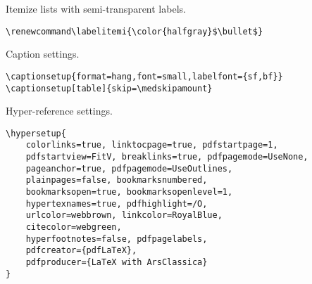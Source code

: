 Itemize lists with semi-transparent labels.
\begin{lstlisting}
\renewcommand\labelitemi{\color{halfgray}$\bullet$} 
\end{lstlisting}



Caption settings.
\begin{lstlisting}
\captionsetup{format=hang,font=small,labelfont={sf,bf}}
\captionsetup[table]{skip=\medskipamount}
\end{lstlisting}



Hyper-reference settings.
\begin{lstlisting}
\hypersetup{
    colorlinks=true, linktocpage=true, pdfstartpage=1, 
    pdfstartview=FitV, breaklinks=true, pdfpagemode=UseNone, 
    pageanchor=true, pdfpagemode=UseOutlines,
    plainpages=false, bookmarksnumbered,
    bookmarksopen=true, bookmarksopenlevel=1,
    hypertexnames=true, pdfhighlight=/O,
    urlcolor=webbrown, linkcolor=RoyalBlue, 
    citecolor=webgreen,
    hyperfootnotes=false, pdfpagelabels,
    pdfcreator={pdfLaTeX},
    pdfproducer={LaTeX with ArsClassica}
}
\end{lstlisting}